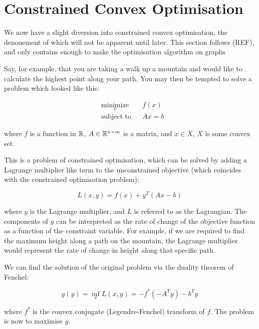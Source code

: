 \documentclass[titlepage]{article}
\begin{document}
\section{Constrained Convex Optimisation}
We now have a slight diversion into constrained convex optimisation, the denouement of which will not be apparent until later. This section follows (REF), and only contains enough to make the optimisation algorithm on graphs

Say, for example, that you are taking a walk up a mountain and would like to calculate the highest point along your path. You may then be tempted to solve a problem which looked like this:

\begin{equation*}
\begin{aligned}
& \underset{x}{\text{minimize}}
& & f\left( x \right) \\
& \text{subject to}
& & Ax = b
\label{orig_problem}
\end{aligned}
\end{equation*}

where \(f\) is a function in \({\mathbb{R}}\), \(A \in {\mathbb{R}}^{n \times m}\) is a matrix, and \(x\in X\), \(X\) is some convex set.

This is a problem of constrained optimisation, which can be solved by adding a Lagrange multiplier like term to the unconstrained objective (which coincides with the constrained optimisation problem): 

\begin{equation}
L\left(x,y\right) = f\left( x \right) + y^T\left(Ax-b\right)
\end{equation}

where \(y\) is the Lagrange multiplier, and \(L\) is referred to as the Lagrangian. The components of \(y\) can be interpreted as the rate of change of the objective function as a function of the constraint variable. For example, if we are required to find the maximum height along a path on the mountain, the Lagrange multiplier would represent the rate of change in height along that specific path. 

We can find the solution of the original problem via the duality theorem of Fenchel:

\begin{equation}
g\left(y\right) = \inf_x L\left(x,y\right) = -f^*\left(-A^Ty\right) -b^Ty
\label{dual_problem}
\end{equation}

where \(f^*\) is the convex conjugate (Legendre-Fenchel) transform of \(f\). The problem is now to maximise \(g\). 
\end{document}
